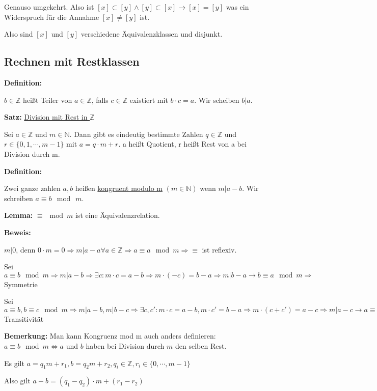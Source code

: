 \documentclass[pdftex,12pt,a4paper,fleqn]{scrartcl}
\begin{document}
Genauso umgekehrt. Also ist $[x] \subset [y] \land [y] \subset [x] \rightarrow [x] = [y]$ was ein Widerspruch für die Annahme $[x] \neq [y]$ ist.

Also sind $[x]$ und $[y]$ verschiedene Äquivalenzklassen und disjunkt.

\subsection{Rechnen mit Restklassen} %
\label{sub:rechnen_mit_restklassen}

\textbf{Definition:}

$b \in \mathbb{Z}$ heißt Teiler von $a \in \mathbb{Z}$, falls $c \in \mathbb{Z}$ existiert mit $b\cdot c = a$. Wir scheiben $b | a$.

\textbf{Satz:} \underline{Division mit Rest in $\mathbb{Z}$}

Sei $a \in \mathbb{Z}$ und $m \in \mathbb{N}$. Dann gibt es eindeutig bestimmte Zahlen $q \in \mathbb{Z}$ und $r \in \{0,1,\cdots,m-1\}$ mit $a=q\cdot m + r$. a heißt Quotient, r heißt Rest von a bei Division durch m.

\textbf{Definition:}

Zwei ganze zahlen $a,b$ heißen \underline{kongruent modulo m} $(m \in \mathbb{N})$ wenn $m | a-b$. Wir schreiben $a \equiv b\mod\ m$.

\textbf{Lemma:} $\equiv \mod m$ ist eine Äquivalenzrelation.

\textbf{Beweis:}

$m | 0$, denn $0 \cdot m = 0 \Rightarrow m | a-a \forall a \in \mathbb{Z} \Rightarrow a \equiv a \mod m \Rightarrow \equiv $ ist reflexiv.

Sei $a \equiv b \mod m \Rightarrow m | a-b \Rightarrow \exists c: m \cdot c = a-b \Rightarrow m \cdot (-c) = b -a \Rightarrow m | b-a \rightarrow b \equiv a \mod m \Rightarrow$ Symmetrie

Sei $a \equiv b, b \equiv c \mod m \Rightarrow m | a-b, m | b-c \Rightarrow \exists c,c': m \cdot c  = a-b, m \cdot c' = b-a \Rightarrow m \cdot (c + c') = a-c \Rightarrow m | a-c \rightarrow a \equiv c \mod m \Rightarrow $ Transitivität

\textbf{Bemerkung:} Man kann Kongruenz mod m auch anders definieren: $a \equiv b \mod m \Leftrightarrow a$ und $b$ haben bei Division durch $m$ den selben Rest. 

Es gilt $a = q_1 m + r_1, b = q_2 m + r_2, q_i \in \mathbb{Z}, r_i \in \{0,\cdots,m-1\}$

Also gilt $a-b = (q_1 - q_2) \cdot m + (r_1 - r_2)$
\end{document}

